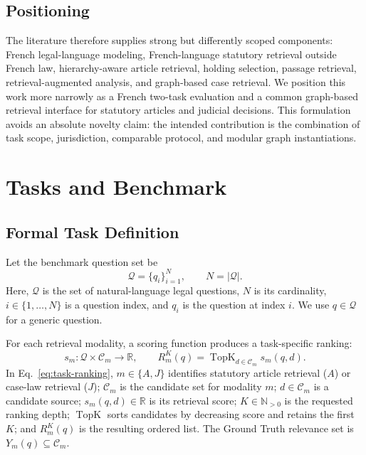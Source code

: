 \documentclass[runningheads]{llncs}
\begin{document}
\subsection{Positioning}

The literature therefore supplies strong but differently scoped components: French legal-language modeling, French-language statutory retrieval outside French law, hierarchy-aware article retrieval, holding selection, passage retrieval, retrieval-augmented analysis, and graph-based case retrieval. We position this work more narrowly as a French two-task evaluation and a common graph-based retrieval interface for statutory articles and judicial decisions. This formulation avoids an absolute novelty claim: the intended contribution is the combination of task scope, jurisdiction, comparable protocol, and modular graph instantiations.

\section{Tasks and Benchmark}

\subsection{Formal Task Definition}

Let the benchmark question set be
\begin{equation}
  \mathcal{Q}=\{q_i\}_{i=1}^{N},
  \qquad N=|\mathcal{Q}|.
  \label{eq:questions}
\end{equation}
Here, \(\mathcal{Q}\) is the set of natural-language legal questions, \(N\) is its cardinality, \(i\in\{1,\ldots,N\}\) is a question index, and \(q_i\) is the question at index \(i\). We use \(q\in\mathcal{Q}\) for a generic question.

For each retrieval modality, a scoring function produces a task-specific ranking:
\begin{equation}
  s_m:\mathcal{Q}\times\mathcal{C}_m\rightarrow\mathbb{R},
  \qquad
  R_m^K(q)=\operatorname{TopK}_{d\in\mathcal{C}_m}s_m(q,d).
  \label{eq:task-ranking}
\end{equation}
In Eq.~\eqref{eq:task-ranking}, \(m\in\{A,J\}\) identifies statutory article retrieval (\(A\)) or case-law retrieval (\(J\)); \(\mathcal{C}_m\) is the candidate set for modality \(m\); \(d\in\mathcal{C}_m\) is a candidate source; \(s_m(q,d)\in\mathbb{R}\) is its retrieval score; \(K\in\mathbb{N}_{>0}\) is the requested ranking depth; \(\operatorname{TopK}\) sorts candidates by decreasing score and retains the first \(K\); and \(R_m^K(q)\) is the resulting ordered list. The Ground Truth relevance set is \(Y_m(q)\subseteq\mathcal{C}_m\).
\end{document}
